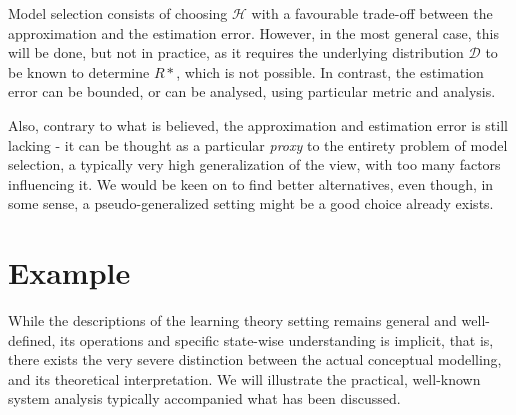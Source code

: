 Model selection consists of choosing $\mathcal{H}$ with a favourable trade-off between the approximation and the estimation error. However, in the most general case, this will be done, but not in practice, as it requires the underlying distribution $\mathcal{D}$ to be known to determine $R{*}$, which is not possible. In contrast, the estimation error can be bounded, or can be analysed, using particular metric and analysis. 

Also, contrary to what is believed, the approximation and estimation error is still lacking - it can be thought as a particular \textit{proxy} to the entirety problem of model selection, a typically very high generalization of the view, with too many factors influencing it. We would be keen on to find better alternatives, even though, in some sense, a pseudo-generalized setting might be a good choice already exists. 

\section{Example}

While the descriptions of the learning theory setting remains general and well-defined, its operations and specific state-wise understanding is implicit, that is, there exists the very severe distinction between the actual conceptual modelling, and its theoretical interpretation. We will illustrate the practical, well-known system analysis typically accompanied what has been discussed. 

